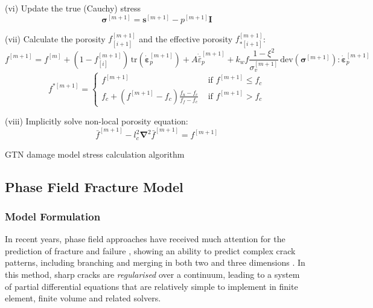 \documentclass[sn-mathphys,Numbered]{sn-jnl}%
\newcommand{\bb}{\boldsymbol}
\begin{document}
\begin{algorithm}[htbp]
(vi) Update the true (Cauchy) stress
\begin{equation}
	\boldsymbol{\sigma}^{[m+1]} = \boldsymbol{s}^{[m+1]} -  p^{[m+1]}\textbf{I} \nonumber
\end{equation}


(vii) Calculate the porosity $f_{[i+1]}^{[m+1]}$ and the effective porosity $f_{*[i+1]}^{[m+1]}$:
\begin{equation}
	f^{[m+1]} = f^{[m]} + \left(1 - f^{[m+1]}_{[i]}\right) \, \text{tr}\left(\dot{\boldsymbol{\varepsilon}}^{[m+1]}_p\right)
	+ A \dot{\bar{\varepsilon}}^{[m+1]}_p
	+ k_w f\frac{1 - \xi^2 }{\sigma_v^{[m+1]}} \,\text{dev}(\bb{\sigma}^{[m+1]}):{\dot{\boldsymbol{\varepsilon}}}_p^{[m+1]}
\end{equation}
\begin{equation}
	f^{*[m+1]} =
	\left\{
	\begin{array}{ll}
		f^{[m+1]}  & \text { if } f^{[m+1]}  \leq f_c \\
		f_c + \left(f^{[m+1]} - f_c\right) \frac{f_u - f_c}{f_f - f_c} & \text { if } f^{[m+1]}  > f_c
	\end{array}\right.
\end{equation}


(viii) Implicitly solve non-local porosity equation:
\begin{equation}
	\bar{f}^{[m+1]} -  l_c^2 \bb{\nabla}^2 \bar{f}^{[m+1]} = f^{[m+1]}
\end{equation}

\caption{GTN damage model stress calculation algorithm}
\end{algorithm}






\subsection{Phase Field Fracture Model}

\subsubsection{Model Formulation}
In recent years, phase field approaches have received much attention for the prediction of fracture and failure \cite{borden_phase-field_2012, miehe_phase_2010, ambati_phase-field_2015, borden_phase-field_2016, miehe_phase_2016, dittmann_variational_2018, samaniego_phase-field_2021}, showing an ability to predict complex crack patterns, including branching and merging in both two and three dimensions \cite{borden_phase-field_2012, miehe_phase_2010}.
In this method, sharp cracks are \emph{regularised} over a continuum, leading to a system of partial differential equations that are relatively simple to implement in finite element, finite volume and related solvers.
\end{document}
